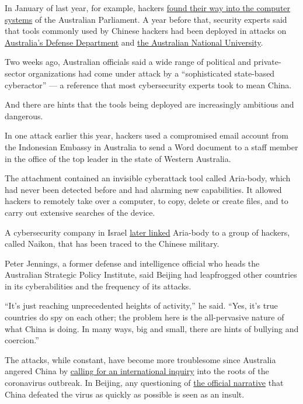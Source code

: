 In January of last year, for example, hackers
\href{https://www.nytimes.com/2019/02/07/world/australia/cyberattack-parliament-hack.html}{found
their way into the computer systems} of the Australian Parliament. A
year before that, security experts said that tools commonly used by
Chinese hackers had been deployed in attacks on
\href{https://www.smh.com.au/world/north-america/tens-of-thousands-of-australian-firms-could-be-affected-by-chinese-hack-top-official-20181221-p50nl0.html}{Australia's
Defense Department} and
\href{https://www.smh.com.au/politics/federal/chinese-hackers-breach-anu-putting-national-security-at-risk-20180706-p4zq0q.html}{the
Australian National University}.

Two weeks ago, Australian officials said a wide range of political and
private-sector organizations had come under attack by a ``sophisticated
state-based cyberactor'' --- a reference that most cybersecurity experts
took to mean China.

And there are hints that the tools being deployed are increasingly
ambitious and dangerous.

In one attack earlier this year, hackers used a compromised email
account from the Indonesian Embassy in Australia to send a Word document
to a staff member in the office of the top leader in the state of
Western Australia.

The attachment contained an invisible cyberattack tool called Aria-body,
which had never been detected before and had alarming new capabilities.
It allowed hackers to remotely take over a computer, to copy, delete or
create files, and to carry out extensive searches of the device.

A cybersecurity company in Israel
\href{https://www.nytimes.com/2020/05/07/world/asia/china-hacking-military-aria.html}{later
linked} Aria-body to a group of hackers, called Naikon, that has been
traced to the Chinese military.

Peter Jennings, a former defense and intelligence official who heads the
Australian Strategic Policy Institute, said Beijing had leapfrogged
other countries in its cyberabilities and the frequency of its attacks.

``It's just reaching unprecedented heights of activity,'' he said.
``Yes, it's true countries do spy on each other; the problem here is the
all-pervasive nature of what China is doing. In many ways, big and
small, there are hints of bullying and coercion.''

The attacks, while constant, have become more troublesome since
Australia angered China by
\href{https://www.nytimes.com/2020/05/11/world/australia/coronavirus-china-inquiry.html}{calling
for an international inquiry} into the roots of the coronavirus
outbreak. In Beijing, any questioning of
\href{https://www.nytimes.com/2020/04/08/world/asia/coronavirus-china-narrative.html}{the
official narrative} that China defeated the virus as quickly as possible
is seen as an insult.

